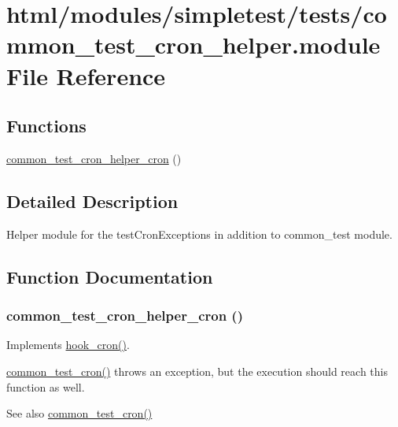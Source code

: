 \hypertarget{common__test__cron__helper_8module}{
\section{html/modules/simpletest/tests/common\_\-test\_\-cron\_\-helper.module File Reference}
\label{common__test__cron__helper_8module}
}
\subsection*{Functions}
\begin{DoxyCompactItemize}
\item 
\hyperlink{common__test__cron__helper_8module_a0ca851f7500b22a25689231b89b24b1e}{common\_\-test\_\-cron\_\-helper\_\-cron} ()
\end{DoxyCompactItemize}


\subsection{Detailed Description}
Helper module for the testCronExceptions in addition to common\_\-test module. 

\subsection{Function Documentation}
\hypertarget{common__test__cron__helper_8module_a0ca851f7500b22a25689231b89b24b1e}{
\subsubsection[{common\_\-test\_\-cron\_\-helper\_\-cron}]{\setlength{\rightskip}{0pt plus 5cm}common\_\-test\_\-cron\_\-helper\_\-cron ()}}
\label{common__test__cron__helper_8module_a0ca851f7500b22a25689231b89b24b1e}
Implements \hyperlink{group__hooks_gaf07f1e3d98112fc2ba6920cf7ee6fb16}{hook\_\-cron()}.

\hyperlink{common__test_8module_af635bc632ff8fae03cc7ffc65262b065}{common\_\-test\_\-cron()} throws an exception, but the execution should reach this function as well.

\begin{DoxySeeAlso}{See also}
\hyperlink{common__test_8module_af635bc632ff8fae03cc7ffc65262b065}{common\_\-test\_\-cron()} 
\end{DoxySeeAlso}
